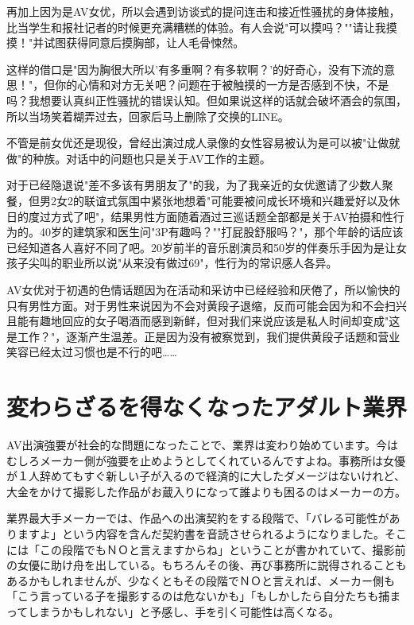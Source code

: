\documentclass[12pt,UTF8]{ctexbook}
\begin{document}
再加上因为是AV女优，所以会遇到访谈式的提问连击和接近性骚扰的身体接触，比当学生和报社记者的时候更充满糟糕的体验。有人会说"可以摸吗？""请让我摸摸！"并试图获得同意后摸胸部，让人毛骨悚然。

这样的借口是"因为胸很大所以'有多重啊？有多软啊？'的好奇心，没有下流的意思！"，但你的心情和对方无关吧？问题在于被触摸的一方是否感到不快，不是吗？我想要认真纠正性骚扰的错误认知。但如果说这样的话就会破坏酒会的氛围，所以当场笑着糊弄过去，回家后马上删除了交换的LINE。

不管是前女优还是现役，曾经出演过成人录像的女性容易被认为是可以被"让做就做"的种族。对话中的问题也只是关于AV工作的主题。

对于已经隐退说"差不多该有男朋友了"的我，为了我亲近的女优邀请了少数人聚餐，但男2女2的联谊式氛围中紧张地想着"可能要被问成长环境和兴趣爱好以及休日的度过方式了吧"，结果男性方面随着酒过三巡话题全部都是关于AV拍摄和性行为的。40岁的建筑家和医生问"3P有趣吗？""打屁股舒服吗？"，那个年龄的话应该已经知道各人喜好不同了吧。20岁前半的音乐剧演员和50岁的伴奏乐手因为是让女孩子尖叫的职业所以说"从来没有做过69"，性行为的常识感人各异。

AV女优对于初遇的色情话题因为在活动和采访中已经经验和厌倦了，所以愉快的只有男性方面。对于男性来说因为不会对黄段子退缩，反而可能会因为和不会扫兴且能有趣地回应的女子喝酒而感到新鲜，但对我们来说应该是私人时间却变成"这是工作？"，逐渐产生温差。正是因为没有被察觉到，我们提供黄段子话题和营业笑容已经太过习惯也是不行的吧……

\switchcolumn

\section{変わらざるを得なくなったアダルト業界}

AV出演強要が社会的な問題になったことで、業界は変わり始めています。今はむしろメーカー側が強要を止めようとしてくれているんですよね。事務所は女優が１人辞めてもすぐ新しい子が入るので経済的に大したダメージはないけれど、大金をかけて撮影した作品がお蔵入りになって誰よりも困るのはメーカーの方。

業界最大手メーカーでは、作品への出演契約をする段階で、「バレる可能性がありますよ」という内容を含んだ契約書を音読させられるようになりました。そこには「この段階でもＮＯと言えますからね」ということが書かれていて、撮影前の女優に助け舟を出している。もちろんその後、再び事務所に説得されることもあるかもしれませんが、少なくともその段階でＮＯと言えれば、メーカー側も「こう言っている子を撮影するのは危ないかも」「もしかしたら自分たちも捕まってしまうかもしれない」と予感し、手を引く可能性は高くなる。
\end{document}
